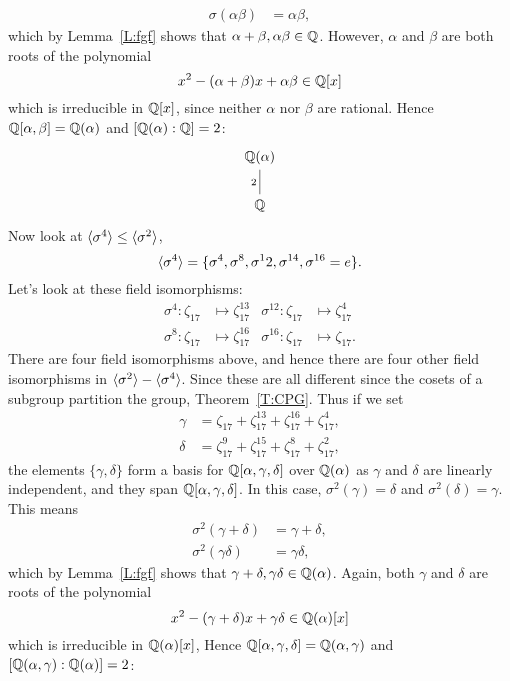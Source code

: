 \documentclass{ximera}
\begin{document}
\begin{example}
\begin{align*}
    \sigma(\alpha\beta) &= \alpha\beta,
  \end{align*}
  which by Lemma~\ref{L:fgf} shows that
  $\alpha+\beta,\alpha\beta\in\mathbb Q$. However, $\alpha$ and $\beta$ are
  both roots of the polynomial
  \[
  x^2 - (\alpha +\beta) x + \alpha\beta\in\mathbb Q[x]
  \]
  which is irreducible in $\mathbb Q[x]$, since neither $\alpha$ nor $\beta$
  are rational. Hence $\mathbb Q[\alpha,\beta]= \mathbb Q(\alpha)$ and
  $[\mathbb Q(\alpha):\mathbb Q] = 2$:
  \[
  \begin{tikzcd}
    \Q(\alpha) \\ \Q \ar[u,-,"2"]
  \end{tikzcd}
  \]
  Now look at $\langle\sigma^4\rangle\leq \langle \sigma^2\rangle$,
  \[
  \langle\sigma^4\rangle = \{ \sigma^4, \sigma^8,\sigma^12,\sigma^{14},\sigma^{16} = e\}.
  \]
  Let's look at these field isomorphisms:
  \begin{align*}
    \sigma^4: \zeta_{17} &\mapsto \zeta_{17}^{13}    & \sigma^{12}: \zeta_{17} &\mapsto \zeta_{17}^{4}\\
    \sigma^8: \zeta_{17} &\mapsto \zeta_{17}^{16} & \sigma^{16}: \zeta_{17} &\mapsto \zeta_{17}.
  \end{align*}
  There are four field isomorphisms above, and hence there are four
  other field isomorphisms in $\langle\sigma^2\rangle - \langle \sigma^4\rangle$. Since 
  these are all different since the cosets of a subgroup partition the
  group, Theorem~\ref{T:CPG}. Thus if we set
  \begin{align*}
    \gamma &= \zeta_{17}   + \zeta_{17}^{13} + \zeta_{17}^{16} + \zeta_{17}^{4},\\
    \delta &= \zeta_{17}^9 + \zeta_{17}^{15} + \zeta_{17}^{8} + \zeta_{17}^{2},
  \end{align*}
  the elements $\{\gamma,\delta\}$ form a basis for
  $\mathbb Q[\alpha,\gamma,\delta]$ over $\mathbb Q(\alpha)$ as $\gamma$ and
  $\delta$ are linearly independent, and they span
  $\mathbb Q[\alpha,\gamma,\delta]$.  In this case, $\sigma^2(\gamma)= \delta$ and
  $\sigma^2(\delta) = \gamma$. This means
  \begin{align*}
    \sigma^2(\gamma+\delta) &= \gamma + \delta,\\
    \sigma^2(\gamma\delta) &= \gamma\delta,
  \end{align*}
  which by Lemma~\ref{L:fgf} shows that
  $\gamma+\delta,\gamma\delta\in\mathbb Q(\alpha)$. Again, both $\gamma$ and
  $\delta$ are roots of the polynomial
  \[
  x^2 - (\gamma +\delta) x + \gamma\delta\in\mathbb Q(\alpha)[x]
  \]
  which is irreducible in $\mathbb Q(\alpha)[x]$, Hence
  $\mathbb Q[\alpha,\gamma,\delta] = \mathbb Q(\alpha,\gamma)$ and
  $[\mathbb Q(\alpha,\gamma):\mathbb Q(\alpha)] = 2$:

\end{example}
\end{document}

